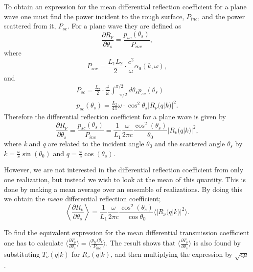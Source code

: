 \documentclass[../main.tex]{subfiles}
\begin{document}
To obtain an expression for the mean differential reflection coefficient for a plane wave one must find the power incident to the rough surface, $P_{inc}$, and the power scattered from it, $P_{sc}$. For a plane wave they are defined as
\begin{equation}
    \frac{\partial R_\nu}{\partial \theta_s} = \frac{p_{sc}(\theta_s)}{P_{inc}},
\end{equation}
where 
\begin{equation}
    P_{inc} = \frac{L_1 L_2}{2}\cdot\frac{c^2}{\omega}\alpha_0(k,\omega),
\end{equation}
and 
\begin{equation}
\begin{array}{cc}
    P_{sc} = \frac{L_2}{2}\cdot\frac{c^2}{\omega} \int_{-\pi/2}^{\pi/2} d\theta_s p_{sc}(\theta_s) \\
    p_{sc}(\theta_s) = \frac{L_2}{4\pi}\omega \cdot \cos^2\theta_s |R_\nu(q|k)|^2.
\end{array}
\end{equation}
Therefore the differential reflection coefficient for a plane wave is given by
\begin{equation}
    \frac{\partial R_\nu}{\partial \theta_s} = \frac{p_{sc}(\theta_s)}{P_{inc}} = \frac{1}{L_1}\frac{\omega}{2\pi c}\frac{\cos^2(\theta_s)}{\theta_0}|R_\nu(q|k)|^2,
\end{equation}
where \textit{k} and \textit{q} are related to the incident angle $\theta_0$ and the scattered angle $\theta_s$ by $k = \frac{\omega}{c}\sin(\theta_0)$ and $q = \frac{\omega}{c}\cos(\theta_s)$.

However, we are not interested in the differential reflection coefficient from only one realization, but instead we wish to look at the mean of this quantity. This is done by making a mean average over an ensemble of realizations. By doing this we obtain the \textit{mean} differential reflection coefficient;
\begin{equation} \label{MDRC}
    \left\langle \frac{\partial R_\nu}{\partial \theta_s} \right\rangle =  \frac{1}{L_1}\frac{\omega}{2\pi c}\frac{\cos^2(\theta_s)}{\cos\theta_0} \langle |R_\nu(q|k)|^2 \rangle.
\end{equation}

To find the equivalent expression for the mean differential transmission coefficient one has to calculate $\langle \frac{\partial T_\nu}{\partial \theta_s}\rangle = \langle \frac{p_{tr}(\theta_t}{P_{inc}}\rangle$. The result shows that $\langle \frac{\partial T_\nu}{\partial \theta_s}\rangle$ is also found by substituting $T_\nu(q|k)$ for $R_\nu(q|k)$, and then multiplying the expression by $\sqrt{\epsilon\mu}$ \cite{MaradudinSanchez1995}.
\end{document}
